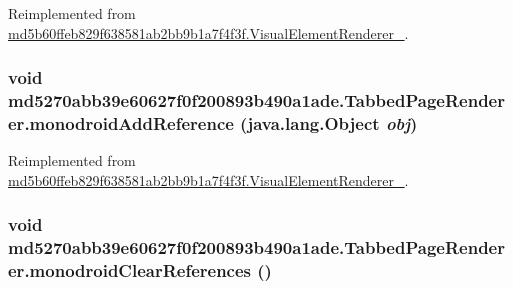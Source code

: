 Reimplemented from \hyperlink{classmd5b60ffeb829f638581ab2bb9b1a7f4f3f_1_1_visual_element_renderer__1_3ae26bd8575212fb6d6f14487b4f48d4}{md5b60ffeb829f638581ab2bb9b1a7f4f3f.VisualElementRenderer\_}.\hypertarget{classmd5270abb39e60627f0f200893b490a1ade_1_1_tabbed_page_renderer_c61a8f262b7596ff2eb4e667464f9d36}{
\subsubsection[{monodroidAddReference}]{\setlength{\rightskip}{0pt plus 5cm}void md5270abb39e60627f0f200893b490a1ade.TabbedPageRenderer.monodroidAddReference (java.lang.Object {\em obj})}}
\label{classmd5270abb39e60627f0f200893b490a1ade_1_1_tabbed_page_renderer_c61a8f262b7596ff2eb4e667464f9d36}




Reimplemented from \hyperlink{classmd5b60ffeb829f638581ab2bb9b1a7f4f3f_1_1_visual_element_renderer__1_321b2967faff34b0f7971f55915f583e}{md5b60ffeb829f638581ab2bb9b1a7f4f3f.VisualElementRenderer\_}.\hypertarget{classmd5270abb39e60627f0f200893b490a1ade_1_1_tabbed_page_renderer_3b2f80dac52df3f43f79ec6bd4748239}{
\subsubsection[{monodroidClearReferences}]{\setlength{\rightskip}{0pt plus 5cm}void md5270abb39e60627f0f200893b490a1ade.TabbedPageRenderer.monodroidClearReferences ()}}
\label{classmd5270abb39e60627f0f200893b490a1ade_1_1_tabbed_page_renderer_3b2f80dac52df3f43f79ec6bd4748239}




